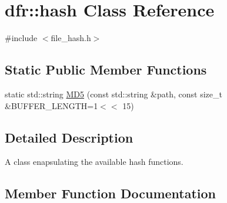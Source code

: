 \hypertarget{classdfr_1_1hash}{}\section{dfr\+:\+:hash Class Reference}
\label{classdfr_1_1hash}


{\ttfamily \#include $<$file\+\_\+hash.\+h$>$}

\subsection*{Static Public Member Functions}
\begin{DoxyCompactItemize}
\item 
static std\+::string \hyperlink{classdfr_1_1hash_a2243da1899b7a4a670d15f58fafbf6ea}{M\+D5} (const std\+::string \&path, const size\+\_\+t \&B\+U\+F\+F\+E\+R\+\_\+\+L\+E\+N\+G\+TH=1$<$$<$ 15)
\end{DoxyCompactItemize}


\subsection{Detailed Description}
A class enapsulating the available hash functions. 

\subsection{Member Function Documentation}
